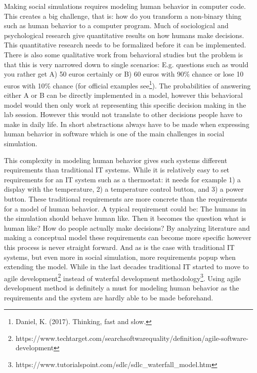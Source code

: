 \documentclass[11pt]{article}
\begin{document}
Making social simulations requires modeling human behavior in computer code. This creates a big challenge, that is: how do you transform a non-binary thing such as human behavior to a computer program. Much of sociological and psychological research give quantitative results on how humans make decisions. This quantitative research needs to be formalized before it can be implemented. There is also some qualitative work from behavioral studies but the problem is that this is very narrowed down to single scenarios: E.g. questions such as would you rather get A) 50 euros certainly or B) 60 euros with 90\% chance or lose 10 euros with 10\% chance (for official examples see\footnote{Daniel, K. (2017). Thinking, fast and slow.}). The probabilities of answering either A or B can be directly implemented in a model, however this behavioral model would then only work at representing this specific decision making in the lab session. However this would not translate to other decisions people have to make in daily life. In short abstractions always have to be made when expressing human behavior in software which is one of the main challenges in social simulation. 

This complexity in modeling human behavior gives such systems different requirements than traditional IT systems. While it is relatively easy to set requirements for an IT system such as a thermostat: it needs for example 1) a display with the temperature, 2) a temperature control button, and 3) a power button. These traditional requirements are more concrete than the requirements for a model of human behavior. A typical requirement could be: The humans in the simulation should behave human like. Then it becomes the question what is human like? How do people actually make decisions? By analyzing literature and making a conceptual model these requirements can become more specific however this process is never straight forward. And as is the case with traditional IT systems, but even more in social simulation, more requirements popup when extending the model. While in the last decades traditional IT started to move to agile development\footnote{https://www.techtarget.com/searchsoftwarequality/definition/agile-software-development} instead of waterfal development methodology\footnote{https://www.tutorialspoint.com/sdlc/sdlc\_waterfall\_model.htm}. Using agile development method is definitely a must for modeling human behavior as the requirements and the system are hardly able to be made beforehand.
\end{document}
